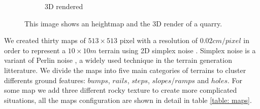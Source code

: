 \documentclass[../document.tex]{subfiles}
\begin{document}
\begin{figure}[H]
\begin{subfigure}[b]{0.45\linewidth}
            \caption{3D rendered}
            \end{subfigure}    
    \caption{This image shows an heightmap and the 3D render of a quarry.}
    \end{figure}
We created thirty maps of $513\times513$ pixel with a resolution of $0.02cm/pixel$ in order to represent a $10\times10m$ terrain using 2D simplex noise \cite{simplex}. Simplex noise is a variant of Perlin noise \cite{perlin}, a widely used technique in the terrain generation litterature. 
We divide the maps into five main categories of terrains to cluster differents ground features: $bumps$, $rails$, $steps$, $slopes$/$ramps$ and $holes$. For some map we add three different rocky texture to create more complicated situations, all the maps configuration are shown in detail in table \ref{table: maps}.
\end{document}
